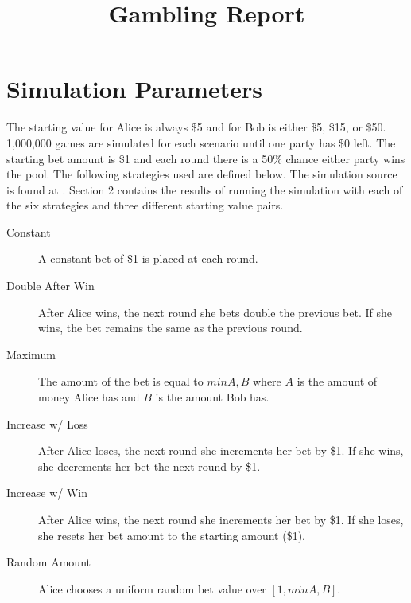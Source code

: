\documentclass[12pt]{article}
\title{Gambling Report}
\begin{document}
	\maketitle
	\section{Simulation Parameters}
		The starting value for Alice is always \$5 and for Bob is either \$5, \$15, or \$50. 1,000,000 games are simulated for each scenario until one party has \$0 left. The starting bet amount is \$1 and each round there is a 50\% chance either party wins the pool. The following strategies used are defined below. The simulation source is found at \cite{gamblingGit}. Section 2 contains the results of running the simulation with each of the six strategies and three different starting value pairs.

		\begin{description}
			\item[Constant]				A constant bet of \$1 is placed at each round.
			\item[Double After Win]		After Alice wins, the next round she bets double the previous bet. If she wins, the bet remains the same as the previous round.
			\item[Maximum]				The amount of the bet is equal to $min{A,B}$ where $A$ is the amount of money Alice has and $B$ is the amount Bob has.
			\item[Increase w/ Loss]		After Alice loses, the next round she increments her bet by \$1. If she wins, she decrements her bet the next round by \$1.
			\item[Increase w/ Win]		After Alice wins, the next round she increments her bet by \$1. If she loses, she resets her bet amount to the starting amount (\$1).
			\item[Random Amount]		Alice chooses a uniform random bet value over $[1, min{A,B}]$.
		\end{description}
\end{document}

